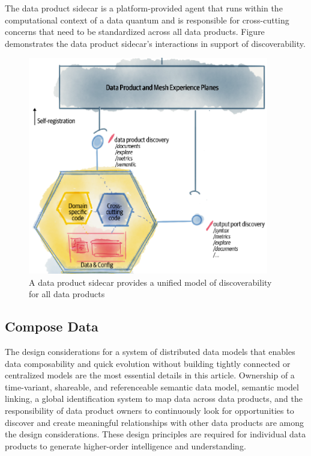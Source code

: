 \documentclass[12pt, a4paper]{book}
\begin{document}
The data product sidecar is a platform-provided agent that runs within the computational context of a data quantum and is responsible for cross-cutting concerns that need to be standardized across all data products. Figure demonstrates the data product sidecar’s interactions in support of discoverability. 

\begin{figure}[ht]
	\begin{framed}
		\centering
		\includegraphics[width=10.5cm]{DiscoverData.png}
		\caption{A data product sidecar provides a unified model of discoverability for all data products}
		\label{DiscoverData}
	\end{framed}
\end{figure}
\vspace{-.3cm}
\subsection{Compose Data}
The design considerations for a system of distributed data models that enables data composability and quick evolution without building tightly connected or centralized models are the most essential details in this article. Ownership of a time-variant, shareable, and referenceable semantic data model, semantic model linking, a global identification system to map data across data products, and the responsibility of data product owners to continuously look for opportunities to discover and create meaningful relationships with other data products are among the design considerations. These design principles are required for individual data products to generate higher-order intelligence and understanding.
\end{document}
